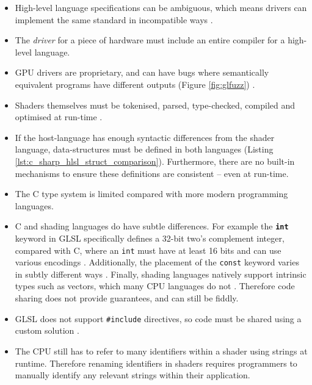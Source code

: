 \documentclass[a4paper,12pt,twoside,openright]{report}
\begin{document}
\begin{itemize}

    \item High-level language specifications can be ambiguous, which means
    drivers can implement the same standard in incompatible ways \cite{TODO}.

    \item The \textit{driver} for a piece of hardware must include an entire
    compiler for a high-level language.

    \item GPU drivers are proprietary, and can have bugs where semantically
    equivalent programs have different outputs (Figure \ref{fig:glfuzz})
    \cite{GLFuzz}.

    \item Shaders themselves must be tokenised, parsed, type-checked, compiled
    and optimised at run-time \cite{TODO}.

    \item If the host-language has enough syntactic differences from the shader
    language, data-structures must be defined in both languages (Listing
    \ref{lst:c_sharp_hlsl_struct_comparison}). Furthermore, there are no
    built-in mechanisms to ensure these definitions are consistent -- even at
    run-time.

    \item The C type system is limited compared with more modern programming
    languages.

    \item C and shading languages do have subtle differences. For example the
    \textbf{\texttt{int}} keyword in GLSL specifically defines a 32-bit two's
    complement integer, compared with C, where an \texttt{int} must have at
    least 16 bits and can use various encodings \cite{TODO}. Additionally, the
    placement of the \texttt{const} keyword varies in subtly different ways
    \cite{TODO}. Finally, shading languages natively support intrinsic types
    such as vectors, which many CPU languages do not \cite{TODO}. Therefore
    code sharing does not provide guarantees, and can still be fiddly.

    \item GLSL does not support \texttt{\#include} directives, so code must be
    shared using a custom solution \cite{TODO}.

    \item The CPU still has to refer to many identifiers within a shader using
    strings at runtime. Therefore renaming identifiers in shaders requires
    programmers to manually identify any relevant strings within their
    application.


\end{itemize}
\end{document}
